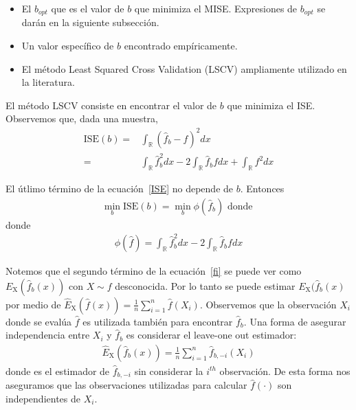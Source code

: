 \begin{itemize}
	\item El $b_{opt}$ que es el valor de $b$ que minimiza el MISE. Expresiones de $b_{opt}$ se darán en la siguiente subsección.
	\item Un valor específico de $b$ encontrado empíricamente.
	\item El método Least Squared Cross Validation (LSCV) ampliamente utilizado en la literatura.
\end{itemize}


El método LSCV consiste en encontrar el valor de $b$ que minimiza el ISE. Observemos que, dada una muestra,
\begin{align}
\label{ISE}
	\text{ISE}(b)=&\int_\mathbb{R} (\widehat{f}_b-f)^2 dx \nonumber\\ 
	=& \int_\mathbb{R} \widehat{f}_b^2dx- 2 \int_\mathbb{R} \widehat{f}_b fdx +\int_\mathbb{R} f^2dx
\end{align}

El útlimo término de la ecuación~\eqref{ISE} no depende de $b$. Entonces
\begin{align}
	\nonumber \min_b \text{ISE}(b)= \min_b \phi(\widehat{f}_b) \text{ donde } 
\end{align}
donde
\begin{align}
\label{fi}
\phi(\widehat{f})=\int_\mathbb{R} \widehat{f}_b^2 dx- 2 \int_\mathbb{R} \widehat{f}_b fdx
\end{align}

Notemos que el segundo término de la ecuación~\eqref{fi} se puede ver como $E_\text{X}(\widehat{f}_b(x))$ con $X \sim f$ desconocida. Por lo tanto se puede estimar $E_\text{X}(\widehat{f}_b(x)$ por medio de $\hat{E}_\text{X}(\widehat{f}(x))=\frac{1}{n}\sum_{i=1}^n \widehat{f}(X_i)$. Observemos que la observación $X_i$ donde se evalúa $\widehat{f}$ es utilizada también para encontrar $\widehat{f}_b$. Una forma de asegurar independencia entre $X_i$ y  $\widehat{f}_b$ es considerar el leave-one out estimador:
\begin{align}
\hat{E}_\text{X}(\widehat{f}_b(x))=\frac{1}{n}\sum_{i=1}^n \widehat{f}_{b,-i}(X_i)
\end{align}	
donde  es el estimador de $\widehat{f}_{b,-i}$ sin considerar la $i^{th}$ observación. De esta forma nos aseguramos que las observaciones utilizadas para calcular  $\widehat{f}(\cdot)$ son independientes de $X_i.$

